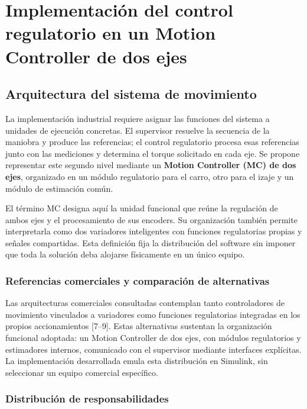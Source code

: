 \documentclass[a4paper,10pt,onecolumn,journal]{ieeeconf}
\numberwithin{equation}{section}
\begin{document}
\par
{}
\section{Implementación del control regulatorio en un Motion Controller de dos ejes}
\label{sec:mc_p2}


\subsection{Arquitectura del sistema de movimiento}

La implementación industrial requiere asignar las funciones del sistema a unidades de ejecución concretas. El supervisor resuelve la secuencia de la maniobra y produce las referencias; el control regulatorio procesa esas referencias junto con las mediciones y determina el torque solicitado en cada eje. Se propone representar este segundo nivel mediante un \textbf{Motion Controller (MC) de dos ejes}, organizado en un módulo regulatorio para el carro, otro para el izaje y un módulo de estimación común.

El término MC designa aquí la unidad funcional que reúne la regulación de ambos ejes y el procesamiento de sus encoders. Su organización también permite interpretarla como dos variadores inteligentes con funciones regulatorias propias y señales compartidas. Esta definición fija la distribución del software sin imponer que toda la solución deba alojarse físicamente en un único equipo.


\subsubsection{Referencias comerciales y comparación de alternativas}

Las arquitecturas comerciales consultadas contemplan tanto controladores de movimiento vinculados a variadores como funciones regulatorias integradas en los propios accionamientos [7--9]. Estas alternativas sustentan la organización funcional adoptada: un Motion Controller de dos ejes, con módulos regulatorios y estimadores internos, comunicado con el supervisor mediante interfaces explícitas. La implementación desarrollada emula esta distribución en Simulink, sin seleccionar un equipo comercial específico.

\subsubsection{Distribución de responsabilidades}
\end{document}

